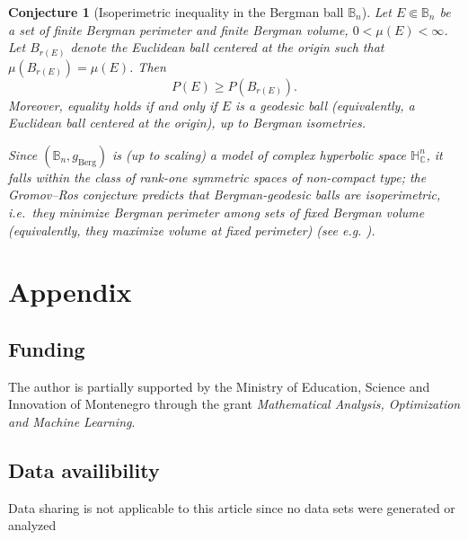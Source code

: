 \documentclass[11pt]{amsart}
\newtheorem{conjecture}[theorem]{Conjecture}
\numberwithin{equation}{section}
\def\ge{\geqslant}
\begin{document}

\begin{conjecture}[Isoperimetric inequality in the Bergman ball $\mathbb B_n$]\label{conj:isopB2}
Let $E\Subset \mathbb B_n$ be a set of finite Bergman perimeter and finite Bergman volume,
$0<\mu(E)<\infty$. Let $B_{r(E)}$ denote the Euclidean ball centered at the origin
such that $\mu(B_{r(E)})=\mu(E)$. Then
\[
P(E)\ge P(B_{r(E)}).
\]
Moreover, equality holds if and only if $E$ is a geodesic ball (equivalently, a Euclidean
ball centered at the origin), up to Bergman isometries.

Since $(\mathbb B_n,g_{\mathrm{Berg}})$ is (up to scaling) a model of complex hyperbolic space $\mathbb H^n_{\mathbb C}$, it falls within the class of rank-one symmetric spaces of non-compact type; the Gromov--Ros conjecture predicts that Bergman-geodesic balls are isoperimetric, i.e.\ they minimize Bergman perimeter among sets of fixed Bergman volume (equivalently, they maximize volume at fixed perimeter) (see e.g. \cite{Silini2024}).

\end{conjecture}



\section{Appendix}




\subsection*{Funding} The author is partially supported by the Ministry of Education, Science and Innovation of Montenegro through the grant \emph{Mathematical Analysis, Optimization and Machine Learning}.
\subsection*{Data availibility} Data sharing is not applicable to this article since no data sets were generated or analyzed
\end{document}
